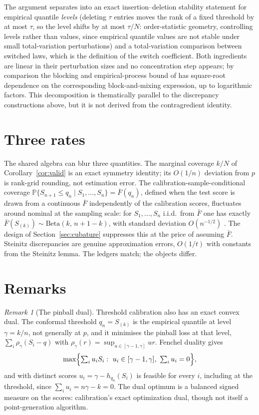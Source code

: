 \documentclass[11pt]{article}
\theoremstyle{remark}
\newtheorem{remark}{Remark}
\newcommand{\Prob}{\mathbb{P}}
\begin{document}
The argument separates into an exact insertion--deletion stability statement for empirical
quantile \emph{levels} (deleting $\tau$ entries moves the rank of a fixed threshold by at most
$\tau$, so the level shifts by at most $\tau/N$: order-statistic geometry, controlling levels
rather than values, since empirical quantile values are not stable under small total-variation
perturbations) and a total-variation comparison between switched laws, which is the definition
of the switch coefficient. Both ingredients are linear in their perturbation sizes and no
concentration step appears; by comparison the blocking and empirical-process bound of
\citet{oliveira2024} has square-root dependence on the corresponding block-and-mixing
expression, up to logarithmic factors. This decomposition is thematically parallel to the
discrepancy constructions above, but it is not derived from the contragredient identity.

\section{Three rates}\label{sec:rates}

The shared algebra can blur three quantities. The marginal coverage $k/N$ of
Corollary~\ref{cor:valid} is an exact symmetry identity; its $O(1/n)$ deviation from $p$ is
rank-grid rounding, not estimation error. The calibration-sample-conditional coverage
$\Prob\{S_{n+1}\le q_n\mid S_1,\dots,S_n\}=\bar F(q_n)$, defined when the test score is drawn
from a continuous $\bar F$ independently of the calibration scores, fluctuates around nominal
at the sampling scale: for $S_1,\dots,S_n$ i.i.d.\ from $\bar F$ one has exactly
$\bar F(S_{(k)})\sim\mathrm{Beta}(k,\,n+1-k)$, with standard deviation $O(n^{-1/2})$
\citep{vovk2005}. The design of Section~\ref{sec:cubature} suppresses this at the price of
assuming $\bar F$. Steinitz discrepancies are genuine approximation errors, $O(1/t)$ with
constants from the Steinitz lemma. The ledgers match; the objects differ.

\section{Remarks}\label{sec:remarks}

\begin{remark}[The pinball dual]
Threshold calibration also has an exact convex dual. The conformal threshold $q_n=S_{(k)}$ is
the empirical quantile at level $\gamma=k/n$, not generally at $p$, and it minimises the
pinball loss \citep{koenker1978} at that level, $\sum_i\rho_\gamma(S_i-q)$ with
$\rho_\gamma(r)=\sup_{u\in[\gamma-1,\gamma]}ur$. Fenchel duality gives
\[
\max\Bigl\{\textstyle\sum_i u_iS_i:\ u_i\in[\gamma-1,\gamma],\ \sum_i u_i=0\Bigr\},
\]
and with distinct scores $u_i=\gamma-h_{q_n}(S_i)$ is feasible for every $i$, including at the
threshold, since $\sum_i u_i=n\gamma-k=0$. The dual optimum is a balanced signed measure on the
scores: calibration's exact optimization dual, though not itself a point-generation algorithm.
\end{remark}
\end{document}
